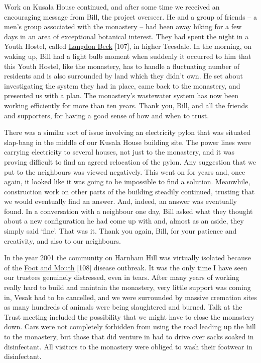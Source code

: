 Work on Kusala House continued, and after some time we received an
encouraging message from Bill, the project overseer. He and a group of
friends -- a men's group associated with the monastery -- had been away
hiking for a few days in an area of exceptional botanical interest. They
had spent the night in a Youth Hostel, called
\href{https://www.yha.org.uk/hostel/yha-langdon-beck?utm_source=google\&utm_medium=maps\&utm_campaign=google-places}{\underline{Langdon
Beck}} {[}107{]}, in higher Teesdale. In the morning, on waking up, Bill
had a light bulb moment when suddenly it occurred to him that this Youth
Hostel, like the monastery, has to handle a fluctuating number of
residents and is also surrounded by land which they didn't own. He set
about investigating the system they had in place, came back to the
monastery, and presented us with a plan. The monastery's wastewater
system has now been working efficiently for more than ten years. Thank
you, Bill, and all the friends and supporters, for having a good sense
of how and when to trust.

There was a similar sort of issue involving an electricity pylon that
was situated slap-bang in the middle of our Kusala House building site.
The power lines were carrying electricity to several houses, not just to
the monastery, and it was proving difficult to find an agreed relocation
of the pylon. Any suggestion that we put to the neighbours was viewed
negatively. This went on for years and, once again, it looked like it
was going to be impossible to find a solution. Meanwhile, construction
work on other parts of the building steadily continued, trusting that we
would eventually find an answer. And, indeed, an answer was eventually
found. In a conversation with a neighbour one day, Bill asked what they
thought about a new configuration he had come up with and, almost as an
aside, they simply said `fine'. That was it. Thank you again, Bill, for
your patience and creativity, and also to our neighbours.

In the year 2001 the community on Harnham Hill was virtually isolated
because of the
\href{https://www.bbc.co.uk/news/magazine-35581830}{\underline{Foot and
Mouth}} {[}108{]} disease outbreak. It was the only time I have seen our
trustees genuinely distressed, even in tears. After many years of
working really hard to build and maintain the monastery, very little
support was coming in, Vesak had to be cancelled, and we were surrounded
by massive cremation sites as many hundreds of animals were being
slaughtered and burned. Talk at the Trust meeting included the
possibility that we might have to close the monastery down. Cars were
not completely forbidden from using the road leading up the hill to the
monastery, but those that did venture in had to drive over sacks soaked
in disinfectant. All visitors to the monastery were obliged to wash
their footwear in disinfectant.

